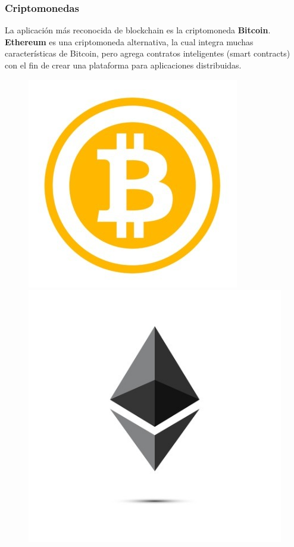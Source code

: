 \documentclass{beamer}
\begin{document}
	\begin{frame}
		\frametitle{Criptomonedas}
		La aplicación más reconocida de blockchain es la criptomoneda \textbf{Bitcoin}.\\
		\vspace{4mm}
		\textbf{Ethereum} es una criptomoneda alternativa, la cual integra muchas características de Bitcoin, pero agrega contratos inteligentes (smart contracts) con el fin de crear una plataforma para aplicaciones distribuidas.
		\begin{figure}[h]
			\includegraphics[scale=.2]{bitcoin_logo}
			\centering
			\includegraphics[scale=.2]{ethereum_logo}
			\centering
		\end{figure}
	\end{frame}
	
\end{document}
